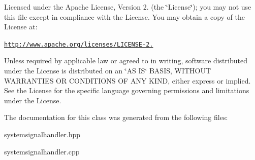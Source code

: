 Licensed under the Apache License, Version 2. (the \char`\"{}\+License\char`\"{}); you may not use this file except in compliance with the License. You may obtain a copy of the License at\+:

\href{http://www.apache.org/licenses/LICENSE-2.0}{\tt http\+://www.\+apache.\+org/licenses/\+L\+I\+C\+E\+N\+S\+E-\/2.}

Unless required by applicable law or agreed to in writing, software distributed under the License is distributed on an \char`\"{}\+A\+S I\+S\char`\"{} B\+A\+S\+I\+S, W\+I\+T\+H\+O\+U\+T W\+A\+R\+R\+A\+N\+T\+I\+E\+S O\+R C\+O\+N\+D\+I\+T\+I\+O\+N\+S O\+F A\+N\+Y K\+I\+N\+D, either express or implied. See the License for the specific language governing permissions and limitations under the License. 

The documentation for this class was generated from the following files\+:\begin{DoxyCompactItemize}
\item 
systemsignalhandler.\+hpp\item 
systemsignalhandler.\+cpp\end{DoxyCompactItemize}

